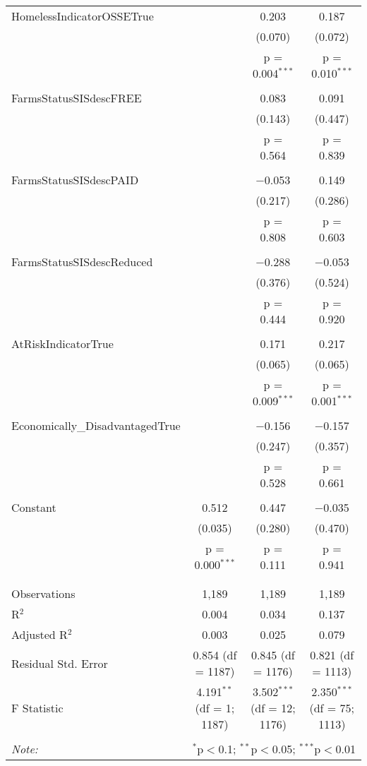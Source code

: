 \begin{table}[!htbp]
\begin{tabular}{@{\extracolsep{5pt}}lccc}
 HomelessIndicatorOSSETrue &  & 0.203 & 0.187 \\ 
  &  & (0.070) & (0.072) \\ 
  &  & p = 0.004$^{***}$ & p = 0.010$^{***}$ \\ 
  & & & \\ 
 FarmsStatusSISdescFREE &  & 0.083 & 0.091 \\ 
  &  & (0.143) & (0.447) \\ 
  &  & p = 0.564 & p = 0.839 \\ 
  & & & \\ 
 FarmsStatusSISdescPAID &  & $-$0.053 & 0.149 \\ 
  &  & (0.217) & (0.286) \\ 
  &  & p = 0.808 & p = 0.603 \\ 
  & & & \\ 
 FarmsStatusSISdescReduced &  & $-$0.288 & $-$0.053 \\ 
  &  & (0.376) & (0.524) \\ 
  &  & p = 0.444 & p = 0.920 \\ 
  & & & \\ 
 AtRiskIndicatorTrue &  & 0.171 & 0.217 \\ 
  &  & (0.065) & (0.065) \\ 
  &  & p = 0.009$^{***}$ & p = 0.001$^{***}$ \\ 
  & & & \\ 
 Economically\_DisadvantagedTrue &  & $-$0.156 & $-$0.157 \\ 
  &  & (0.247) & (0.357) \\ 
  &  & p = 0.528 & p = 0.661 \\ 
  & & & \\ 
 Constant & 0.512 & 0.447 & $-$0.035 \\ 
  & (0.035) & (0.280) & (0.470) \\ 
  & p = 0.000$^{***}$ & p = 0.111 & p = 0.941 \\ 
  & & & \\ 
\hline \\[-1.8ex] 
Observations & 1,189 & 1,189 & 1,189 \\ 
R$^{2}$ & 0.004 & 0.034 & 0.137 \\ 
Adjusted R$^{2}$ & 0.003 & 0.025 & 0.079 \\ 
Residual Std. Error & 0.854 (df = 1187) & 0.845 (df = 1176) & 0.821 (df = 1113) \\ 
F Statistic & 4.191$^{**}$ (df = 1; 1187) & 3.502$^{***}$ (df = 12; 1176) & 2.350$^{***}$ (df = 75; 1113) \\ 
\hline 
\hline \\[-1.8ex] 
\textit{Note:}  & \multicolumn{3}{r}{$^{*}$p$<$0.1; $^{**}$p$<$0.05; $^{***}$p$<$0.01} \\ 
\end{tabular} 
\end{table} 

